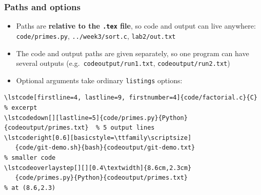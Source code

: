\documentclass[aspectratio=169,10pt,compress]{beamer}
\begin{document}
\begin{frame}[t,fragile] \frametitle{Paths and options}
  \begin{itemize}\small
    \item Paths are \textbf{relative to the \texttt{.tex} file}, so code and output can live
          anywhere: \texttt{code/primes.py}, \texttt{../week3/sort.c}, \texttt{lab2/out.txt}
    \item The code and output paths are given separately, so one program can have
          several outputs (e.g.\ \texttt{codeoutput/run1.txt}, \texttt{codeoutput/run2.txt})
    \item Optional arguments take ordinary \texttt{listings} options:
  \end{itemize}


\begin{lstlisting}[language={[LaTeX]TeX}, basicstyle=\ttfamily\scriptsize, frame=single,
                   backgroundcolor=\color{codebg}, rulecolor=\color{gray!40}]
\lstcode[firstline=4, lastline=9, firstnumber=4]{code/factorial.c}{C}  % excerpt
\lstcodedown[][lastline=5]{code/primes.py}{Python}{codeoutput/primes.txt}  % 5 output lines
\lstcoderight[0.6][basicstyle=\ttfamily\scriptsize]
   {code/git-demo.sh}{bash}{codeoutput/git-demo.txt}                       % smaller code
\lstcodeoverlaystep[][][0.4\textwidth]{8.6cm,2.3cm}
   {code/primes.py}{Python}{codeoutput/primes.txt}                         % at (8.6,2.3)
\end{lstlisting}


\end{frame}
\end{document}

